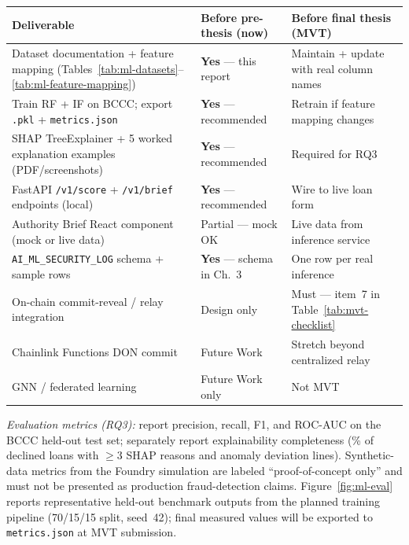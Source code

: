 \documentclass[12pt,a4paper]{report}
\newcommand{\tableheadcolor}{\rowcolor{TableHeadBg}}
\begin{document}
\begin{table}[H]
\centering
\begin{tabular}{p{5.2cm}p{3.8cm}p{4.2cm}}
\toprule
\tableheadcolor
\textbf{Deliverable} & \textbf{Before pre-thesis (now)} & \textbf{Before final thesis (MVT)} \\
\midrule
Dataset documentation + feature mapping (Tables~\ref{tab:ml-datasets}--\ref{tab:ml-feature-mapping}) & \textbf{Yes} --- this report & Maintain + update with real column names \\
Train RF + IF on BCCC; export \texttt{.pkl} + \texttt{metrics.json} & \textbf{Yes} --- recommended & Retrain if feature mapping changes \\
SHAP TreeExplainer + 5 worked explanation examples (PDF/screenshots) & \textbf{Yes} --- recommended & Required for RQ3 \\
FastAPI \texttt{/v1/score} + \texttt{/v1/brief} endpoints (local) & \textbf{Yes} --- recommended & Wire to live loan form \\
Authority Brief React component (mock or live data) & Partial --- mock OK & Live data from inference service \\
\texttt{AI\_ML\_SECURITY\_LOG} schema + sample rows & \textbf{Yes} --- schema in Ch.~3 & One row per real inference \\
On-chain commit-reveal / relay integration & Design only & Must --- item~7 in Table~\ref{tab:mvt-checklist} \\
Chainlink Functions DON commit & Future Work & Stretch beyond centralized relay \\
GNN / federated learning & Future Work only & Not MVT \\
\bottomrule
\end{tabular}
\end{table}

\noindent\textit{Evaluation metrics (RQ3):} report precision, recall, F1, and ROC-AUC on the BCCC held-out test set; separately report explainability completeness (\% of declined loans with $\geq$3 SHAP reasons and anomaly deviation lines). Synthetic-data metrics from the Foundry simulation are labeled ``proof-of-concept only'' and must not be presented as production fraud-detection claims. Figure~\ref{fig:ml-eval} reports representative held-out benchmark outputs from the planned training pipeline (70/15/15 split, seed~42); final measured values will be exported to \texttt{metrics.json} at MVT submission.
\end{document}
